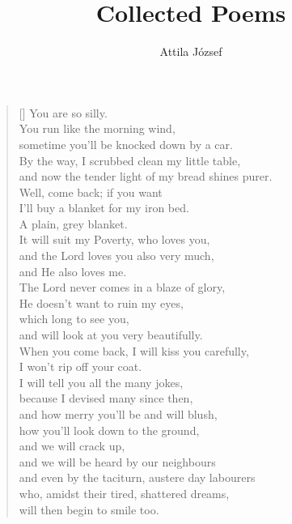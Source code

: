 \documentclass[a4paper,12pt,twoside,final]{book}
\title{Collected Poems}
\author{Attila József}
\begin{document}
\maketitle


\chapter{}


\settowidth{\versewidth}{and now the tender light of my bread shines purer.}

\begin{verse}[\versewidth]
  You are so silly. \\
  You run like the morning wind, \\
  sometime you'll be knocked down by a car. \\
  By the way, I scrubbed clean my little table, \\
  and now the tender light of my bread shines purer. \\
  Well, come back; if you want \\
  I'll buy a blanket for my iron bed. \\
  A plain, grey blanket. \\
  It will suit my Poverty, who loves you, \\
  and the Lord loves you also very much, \\
  and He also loves me. \\
  The Lord never comes in a blaze of glory, \\
  He doesn't want to ruin my eyes, \\
  which long to see you, \\
  and will look at you very beautifully. \\
  When you come back, I will kiss you carefully, \\
  I won't rip off your coat. \\
  I will tell you all the many jokes, \\
  because I devised many since then, \\
  and how merry you'll be and will blush, \\
  how you'll look down to the ground, \\
  and we will crack up, \\
  and we will be heard by our neighbours \\
  and even by the taciturn, austere day labourers \\
  who, amidst their tired, shattered dreams, \\
  will then begin to smile too. \\
\end{verse}
\end{document}
